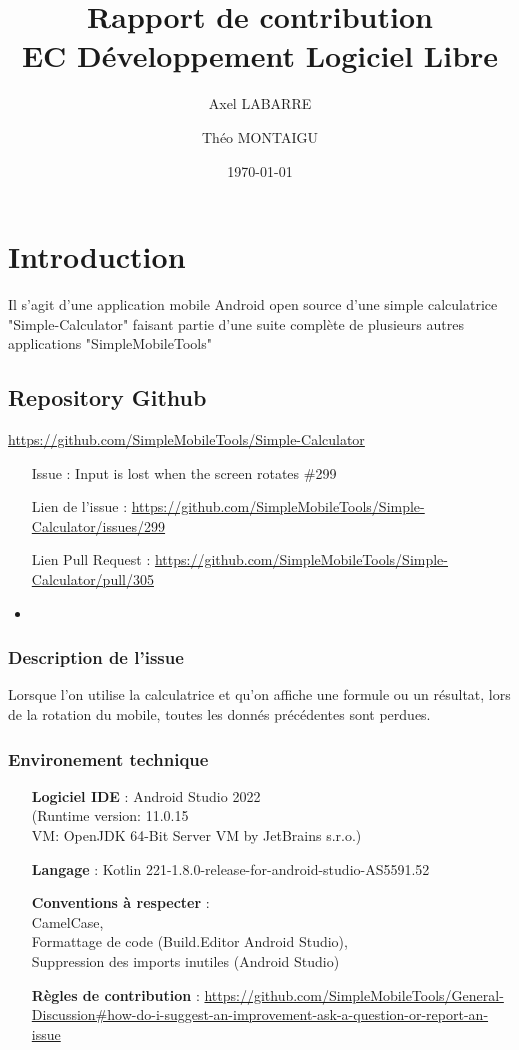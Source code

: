 \documentclass[a4paper, 11pt]{article}
\title{\LARGE Rapport de contribution \\EC Développement Logiciel Libre}
\author{Axel LABARRE \and Théo MONTAIGU}
\date{\today}
\begin{document}
\maketitle
\newpage
\section*{Introduction}
Il s'agit d'une application mobile Android open source d'une simple calculatrice "Simple-Calculator" faisant partie d'une suite complète de plusieurs autres applications "SimpleMobileTools"
\subsection*{Repository Github}
\href{https://github.com/SimpleMobileTools/Simple-Calculator}{https://github.com/SimpleMobileTools/Simple-Calculator}
\begin{itemize}
    \item[Issue] : Input is lost when the screen rotates \#299
    \item [Lien de l'issue] : \href{https://github.com/SimpleMobileTools/Simple-Calculator/issues/299}
    {https://github.com/SimpleMobileTools/Simple-Calculator/issues/299}
    \item [Lien Pull Request] : \href{https://github.com/SimpleMobileTools/Simple-Calculator/pull/305}{https://github.com/SimpleMobileTools/Simple-Calculator/pull/305}
    \item 
\end{itemize}
\subsubsection*{Description de l'issue}
Lorsque l'on utilise la calculatrice et qu'on affiche une formule ou un résultat, lors de la rotation du mobile, toutes les donnés précédentes sont perdues.
\subsubsection*{Environement technique}
\begin{itemize}
    \item [\textbf{Logiciel IDE}] : Android Studio 2022 \\(Runtime version: 11.0.15 \\VM: OpenJDK 64-Bit Server VM by JetBrains s.r.o.)
    \item [\textbf{Langage}] : Kotlin 221-1.8.0-release-for-android-studio-AS5591.52
    \item [\textbf{Conventions à respecter}] : \\CamelCase, \\Formattage de code (Build.Editor Android Studio), \\Suppression des imports inutiles (Android Studio)
    \item [\textbf{Règles de contribution}] : \href{https://github.com/SimpleMobileTools/General-Discussion#how-do-i-suggest-an-improvement-ask-a-question-or-report-an-issue}{https://github.com/SimpleMobileTools/General-Discussion\#how-do-i-suggest-an-improvement-ask-a-question-or-report-an-issue}
\end{itemize}
\end{document}

